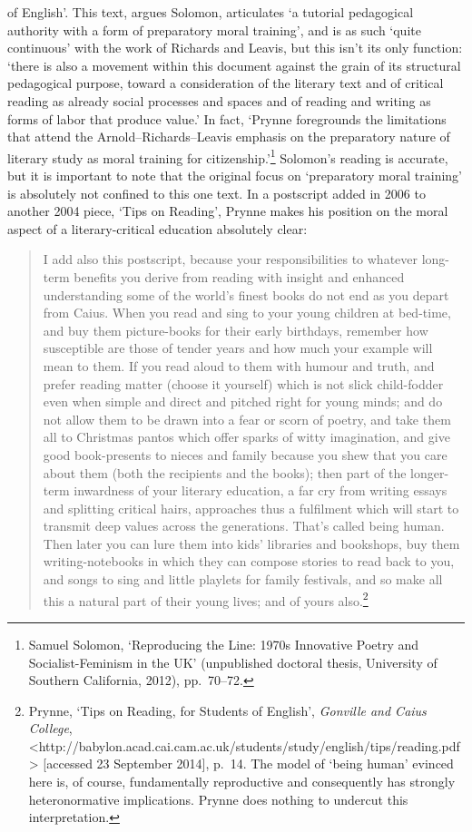 \documentclass[]{article}
\begin{document}
of English’. This text, argues Solomon, articulates ‘a tutorial
pedagogical authority with a form of preparatory moral training’, and is
as such ‘quite continuous’ with the work of Richards and Leavis, but
this isn’t its only function: ‘there is also a movement within this
document against the grain of its structural pedagogical purpose, toward
a consideration of the literary text and of critical reading as already
social processes and spaces and of reading and writing as forms of labor
that produce value.’ In fact, ‘Prynne foregrounds the limitations that
attend the Arnold–Richards–Leavis emphasis on the preparatory nature of
literary study as moral training for citizenship.’\footnote{Samuel
  Solomon, ‘Reproducing the Line: 1970s Innovative Poetry and
  Socialist-Feminism in the UK’ (unpublished doctoral thesis, University
  of Southern California, 2012), pp.~70–72.} Solomon’s reading is
accurate, but it is important to note that the original focus on
‘preparatory moral training’ is absolutely not confined to this one
text. In a postscript added in 2006 to another 2004 piece, ‘Tips on
Reading’, Prynne makes his position on the moral aspect of a
literary-critical education absolutely clear:

\begin{quote}
\singlespacing I add also this postscript, because your responsibilities
to whatever long-term benefits you derive from reading with insight and
enhanced understanding some of the world’s finest books do not end as
you depart from Caius. When you read and sing to your young children at
bed-time, and buy them picture-books for their early birthdays, remember
how susceptible are those of tender years and how much your example will
mean to them. If you read aloud to them with humour and truth, and
prefer reading matter (choose it yourself) which is not slick
child-fodder even when simple and direct and pitched right for young
minds; and do not allow them to be drawn into a fear or scorn of poetry,
and take them all to Christmas pantos which offer sparks of witty
imagination, and give good book-presents to nieces and family because
you shew that you care about them (both the recipients and the books);
then part of the longer-term inwardness of your literary education, a
far cry from writing essays and splitting critical hairs, approaches
thus a fulfilment which will start to transmit deep values across the
generations. That’s called being human. Then later you can lure them
into kids’ libraries and bookshops, buy them writing-notebooks in which
they can compose stories to read back to you, and songs to sing and
little playlets for family festivals, and so make all this a natural
part of their young lives; and of yours also.\footnote{Prynne, ‘Tips on
  Reading, for Students of English’, \emph{Gonville and Caius College},
  \textless{}http://babylon.acad.cai.cam.ac.uk\slash students\slash study\slash english\slash tips\slash reading.pdf\textgreater{}
  {[}accessed 23 September 2014{]}, p.~14. The model of ‘being human’
  evinced here is, of course, fundamentally reproductive and
  consequently has strongly heteronormative implications. Prynne does
  nothing to undercut this interpretation.}
\end{quote}
\end{document}

